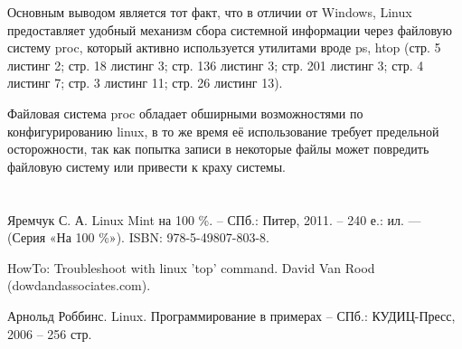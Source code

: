 \documentclass[a4paper, 12pt]{article}		%
\begin{document}
Основным выводом является тот факт, что в отличии от Windows, Linux предоставляет удобный механизм сбора системной информации через файловую систему proc, который активно используется утилитами вроде ps, htop (стр. 5 листинг 2; стр. 18 листинг 3; стр. 136 листинг 3; стр. 201 листинг 3; стр. 4 листинг 7; стр. 3 листинг 11; стр. 26 листинг 13).

Файловая система proc обладает обширными возможностями по конфигурированию linux, в то же время её использование требует предельной осторожности, так как попытка записи в некоторые файлы может повредить файловую систему или привести к краху системы.

\newpage
\section*{}

\begin{thebibliography}{00}

Яремчук С. А.  Linux Mint на 100 \%. -- СПб.: Питер, 2011. -- 240 е.: ил. — (Серия «На 100 \%»). ISBN: 978-5-49807-803-8.

HowTo: Troubleshoot with linux 'top' command. David Van Rood (dowdandassociates.com). 

 Арнольд Роббинс. Linux. Программирование в примерах -- СПб.: КУДИЦ-Пресс, 2006 -- 256 стр.

\end{thebibliography}
\end{document}
